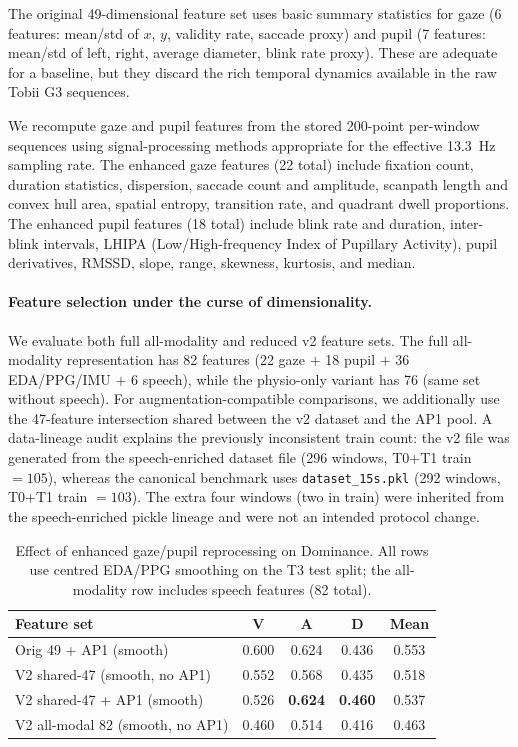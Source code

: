 \documentclass[sigconf,review,anonymous]{acmart}
\newcommand{\best}[1]{\textbf{\textcolor{bestcol}{#1}}}
\begin{document}
The original 49-dimensional feature set uses basic summary statistics for gaze
(6 features: mean/std of $x$, $y$, validity rate, saccade proxy) and pupil
(7 features: mean/std of left, right, average diameter, blink rate proxy).
These are adequate for a baseline, but they discard the rich temporal dynamics
available in the raw Tobii G3 sequences.

We recompute gaze and pupil features from the stored 200-point per-window
sequences using signal-processing methods appropriate for the effective 13.3~Hz
sampling rate.
The enhanced gaze features (22 total) include fixation count, duration
statistics, dispersion, saccade count and amplitude, scanpath length and convex
hull area, spatial entropy, transition rate, and quadrant dwell proportions.
The enhanced pupil features (18 total) include blink rate and duration,
inter-blink intervals, LHIPA (Low/High-frequency Index of Pupillary Activity),
pupil derivatives, RMSSD, slope, range, skewness, kurtosis, and median.

\paragraph{Feature selection under the curse of dimensionality.}
We evaluate both full all-modality and reduced v2 feature sets.
The full all-modality representation has 82 features
(22 gaze $+$ 18 pupil $+$ 36 EDA/PPG/IMU $+$ 6 speech), while the
physio-only variant has 76 (same set without speech).
For augmentation-compatible comparisons, we additionally use the 47-feature
intersection shared between the v2 dataset and the AP1 pool.
A data-lineage audit explains the previously inconsistent train count: the v2
file was generated from the speech-enriched dataset file
(296 windows, T0+T1 train $=105$), whereas the canonical benchmark uses
\texttt{dataset\_15s.pkl} (292 windows, T0+T1 train $=103$).
The extra four windows (two in train) were inherited from the speech-enriched
pickle lineage and were not an intended protocol change.

\begin{table}[t]
\caption{Effect of enhanced gaze/pupil reprocessing on Dominance.
All rows use centred EDA/PPG smoothing on the T3 test split;
the all-modality row includes speech features (82 total).}
\label{tab:v2_dominance}
\centering
\setlength{\tabcolsep}{4pt}
\small
\begin{tabular}{p{}cccc}
\toprule
\textbf{Feature set} & \textbf{V} & \textbf{A} & \textbf{D} & \textbf{Mean} \\
\midrule
Orig 49 + AP1 (smooth)           & 0.600 & 0.624 & 0.436 & 0.553 \\
V2 shared-47 (smooth, no AP1)    & 0.552 & 0.568 & 0.435 & 0.518 \\
V2 shared-47 + AP1 (smooth)      & 0.526 & \best{0.624} & \best{0.460} & 0.537 \\
V2 all-modal 82 (smooth, no AP1) & 0.460 & 0.514 & 0.416 & 0.463 \\
\bottomrule
\end{tabular}
\end{table}
\end{document}
